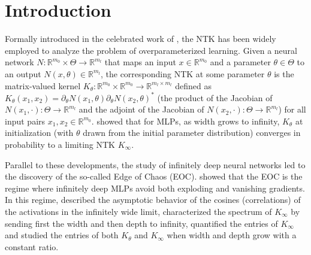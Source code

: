 \documentclass[twoside,11pt]{article}
\newcommand{\R}{\mathbb{R}}
\begin{document}
\section{Introduction} \label{introduction}
Formally introduced in the celebrated work of \citet{Jacotetal2018}, the NTK has been widely employed to analyze the problem of overparameterized learning. Given a neural network $N : \R^{m_0} \times \Theta \to \R^{m_l}$ that maps an input $x \in \R^{m_0}$ and a parameter $\theta \in \Theta$ to an output $N(x,\theta) \in \R^{m_l}$, the corresponding NTK at some parameter $\theta$ is the matrix-valued kernel $K_\theta : \R^{m_0} \times \R^{m_0} \to \R^{m_l \times m_l}$ defined as $K_\theta(x_1,x_2) = \partial_\theta N(x_1,\theta) {\partial_\theta N(x_2,\theta)}^*$ (the product of the Jacobian of $N(x_1,\cdot) : \Theta \to \R^{m_l}$ and the adjoint of the Jacobian of $N(x_2,\cdot) : \Theta \to \R^{m_l}$) for all input pairs $x_1,x_2 \in \R^{m_0}$. \citet{Jacotetal2018} showed that for MLPs, as width grows to infinity, $K_\theta$ at initialization (with $\theta$ drawn from the initial parameter distribution) converges in probability to a limiting NTK $K_\infty$.

Parallel to these developments, the study of infinitely deep neural networks led \citet{Pooleetal2016} to the discovery of the so-called Edge of Chaos (EOC). \citet{Schoenholzetal2017} showed that the EOC is the regime where infinitely deep MLPs avoid both exploding and vanishing gradients. In this regime, \citet{Hayouetal2019} described the asymptotic behavior of the cosines (correlations) of the activations in the infinitely wide limit, \citet{Xiaoetal2020} characterized the spectrum of $K_\infty$ by sending first the width and then depth to infinity, \citet{Hayouetal2022} quantified the entries of $K_\infty$ and \citet{Seleznovaetal22} studied the entries of both $K_\theta$ and $K_\infty$ when width and depth grow with a constant ratio.
\end{document}
